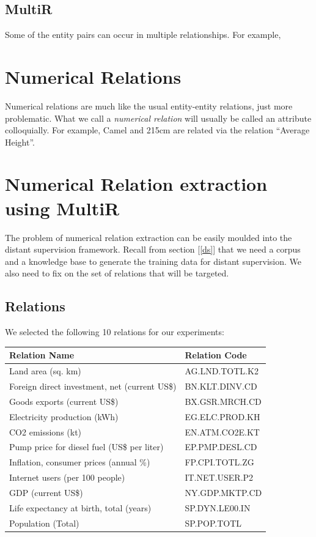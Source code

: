 \documentclass[a4paper,10pt]{article}
\begin{document}
\subsection{MultiR}
Some of the entity pairs can occur in multiple relationships. For example, 

\section{Numerical Relations}
Numerical relations are much like the usual entity-entity relations, just more problematic.
What we call a \emph{numerical relation} will usually be called an attribute colloquially. 
For example, Camel and 215cm are related via the relation ``Average Height''.

\section{Numerical Relation extraction using MultiR}
The problem of numerical relation extraction can be easily moulded into the distant supervision framework.
Recall from section [\ref{ds}] that we need a corpus and a knowledge base to generate the training data for distant supervision.
We also need to fix on the set of relations that will be targeted. 

\subsection{Relations}
We selected the following 10 relations for our experiments:
 \begin{center}
\begin{tabular}{|l|l|}
\hline
Relation Name & Relation Code \\
\hline
Land area (sq. km)&AG.LND.TOTL.K2\\
Foreign direct investment, net (current US\$)&BN.KLT.DINV.CD\\
Goods exports (current US\$)&BX.GSR.MRCH.CD\\
Electricity production (kWh)&EG.ELC.PROD.KH\\
CO2 emissions (kt)&EN.ATM.CO2E.KT\\
Pump price for diesel fuel (US\$ per liter)&EP.PMP.DESL.CD\\
Inflation, consumer prices (annual \%)&FP.CPI.TOTL.ZG\\
Internet users (per 100 people)&IT.NET.USER.P2\\
GDP (current US\$)&NY.GDP.MKTP.CD\\
Life expectancy at birth, total (years)&SP.DYN.LE00.IN\\
Population (Total)&SP.POP.TOTL\\
\hline
\end{tabular}
\end{center}
\end{document}

